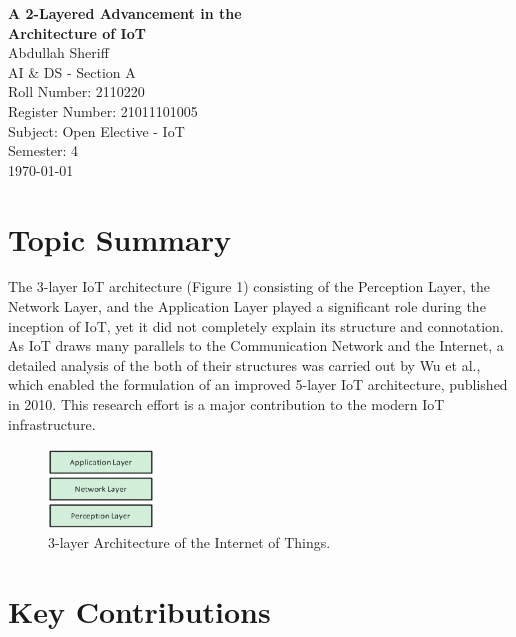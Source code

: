 \documentclass[12pt,a4paper, india]{article}
\begin{document}
\begin{center}
{\textbf {\LARGE A 2-Layered Advancement in the \\
Architecture of IoT}}\\[5mm]
{\large Abdullah Sheriff} \\[1mm]
{\normalsize AI \& DS - Section A} \\[0.8mm]
{\normalsize Roll Number: 2110220} \\[0.8mm]
{\normalsize Register Number: 21011101005} \\[0.8mm]
{\normalsize Subject: Open Elective - IoT} \\[0.8mm]
{\normalsize Semester: 4} \\[5mm]


\today\\[5mm] %
\end{center}


\section{Topic Summary}

	The 3-layer IoT architecture (Figure 1) consisting of the Perception Layer, the Network Layer, and the Application Layer played a significant role during the inception of IoT, yet it did not completely explain its structure and connotation. 
	As IoT draws many parallels to the Communication Network and the Internet, a detailed analysis of the both of their structures was carried out by Wu et al., which enabled the formulation of an improved 5-layer IoT architecture, published in 2010.
	This research effort is a major contribution to the modern IoT infrastructure. \\

 \begin{figure}[h]
    \centering
    \includegraphics[width=0.25\textwidth]{3 Layer Architecture.png}
    \caption{3-layer Architecture of the Internet of Things.}
\end{figure}

\section{Key Contributions}
\end{document}
